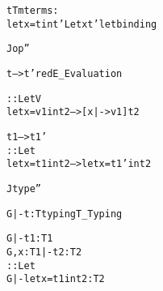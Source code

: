 \begin{alltt}
t \mysym{::} Tm \mysym{::=}                                        \mysym{\mylb\mylb{}}  terms: \mysym{\myrb\myrb{}}
  \mysym{|} let x = t in t'                   \mysym{::}   \mysym{::} Let \mysym{(+}  x  t' \mysym{+)}     \mysym{\mylb\mylb{}}  let binding \mysym{\myrb\myrb{}}


Jop \mysym{::} '' \mysym{::=} 

t --> t' \mysym{::} \mysym{::} red \mysym{::} E_ \mysym{\mylb\mylb{}}  Evaluation \mysym{\myrb\myrb{}} 

\mysym{-----------------------------} :: LetV
let x=v1 in t2 --> [x|->v1]t2 

t1 --> t1'
\mysym{----------------------------------} :: Let
let x=t1 in t2 --> let x=t1' in t2


Jtype \mysym{::} '' \mysym{::=} 

G |- t : T \mysym{::} \mysym{::} typing \mysym{::} T_ \mysym{\mylb\mylb{}}  Typing \mysym{\myrb\myrb{}} 

G |- t1:T1
G,x:T1 |- t2:T2
\mysym{------------------------} :: Let
G |- let x=t1 in t2 : T2
\end{alltt}
